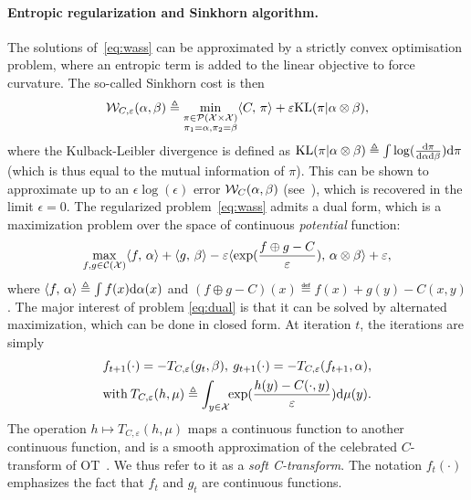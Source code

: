 \paragraph{Entropic regularization and Sinkhorn algorithm.} 

The solutions of~\eqref{eq:wass} can be approximated by a strictly convex optimisation problem, where an entropic term is added to the linear objective to force curvature. The so-called Sinkhorn cost is then
\begin{equation}\label{eq:wass}
    \mathcal{W}_{C,\varepsilon}(\alpha, \beta) \triangleq 
    \min_{
    \substack{
        \pi \in \mathcal{P}(\mathcal{X} \times \mathcal{X})
        \\\pi_1 = \alpha, \pi_2 = \beta
    }    
    } \langle C,\,\pi\rangle + \varepsilon \textrm{KL}(\pi | \alpha \otimes \beta),
\end{equation}
where the Kulback-Leibler divergence is defined as $\textrm{KL}(\pi | \alpha \otimes \beta) \triangleq \int \log(\frac{\textrm{d}\pi}{\textrm{d}\alpha\textrm{d}\beta}) \textrm{d}\pi$ (which is thus equal to the mutual information of $\pi$).
%
This can be shown to approximate up to an $\epsilon \log(\epsilon)$ error $\mathcal{W}_C(\alpha,\beta)$ (see~\cite{2019-Genevay-aistats}), which is recovered in the limit $\epsilon=0$. 
%
The regularized problem~\eqref{eq:wass} admits a dual form, which is a maximization problem over the space of continuous \textit{potential} function:
\begin{equation}\label{eq:dual}
    \max_{f, g \in \mathcal{C}(\mathcal{X})} \langle f,\,\alpha\rangle + \langle g,\,\beta\rangle
    - \varepsilon \langle \exp(\frac{f \oplus g - C}{\varepsilon}),\,\alpha \otimes \beta\rangle + \varepsilon, 
\end{equation}
where $\langle f,\,\alpha\rangle \triangleq \int f(x) \textrm{d}\alpha(x)$ and $(f \oplus g - C)(x) \eqdef f(x)+g(y)-C(x,y)$.
%
The major interest of problem \eqref{eq:dual} is that it can be solved by alternated maximization, which can be done in closed form. At iteration $t$, the iterations are simply
\begin{align}
    &f_{t+1}(\cdot) = - T_{C,\varepsilon}(g_t, \beta), \:
    g_{t+1}(\cdot) = - T_{C,\varepsilon}(f_{t+1}, \alpha), \\
    &\text{with} \:
    T_{C,\varepsilon}(h, \mu) \triangleq 
    \int_{y \in \mathcal{X}}\!\! \exp(\frac{h(y) - C(\cdot, y)}{\varepsilon})\textrm{d} \mu(y).\label{eq:sinkhorn}
\end{align}
The operation $h \mapsto T_{C,\varepsilon}(h, \mu)$  maps a continuous function to another continuous function, and is a smooth approximation of the celebrated $C$-transform of OT~\cite{santambrogio2015optimal}. We thus refer to it as a \textit{soft C-transform}. 
%
The notation $f_t(\cdot)$ emphasizes the fact that $f_t$ and $g_t$ are continuous functions. 
%

